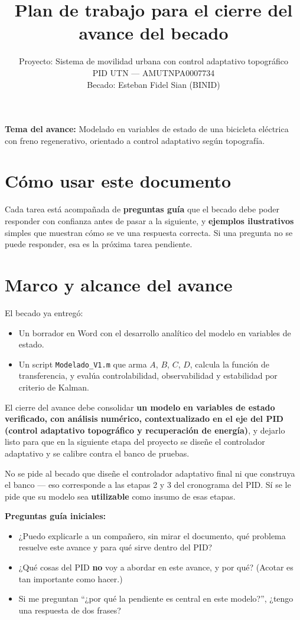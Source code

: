 \documentclass[11pt,a4paper]{article}
\title{Plan de trabajo para el cierre del avance del becado}
\author{Proyecto: Sistema de movilidad urbana con control adaptativo topográfico\\
        PID UTN --- AMUTNPA0007734\\[4pt]
        Becado: Esteban Fidel Sian (BINID)}
\date{}
\begin{document}
\maketitle

\noindent\textbf{Tema del avance:} Modelado en variables de estado de una bicicleta eléctrica con freno regenerativo, orientado a control adaptativo según topografía.

\hrulefill

\section*{Cómo usar este documento}

Cada tarea está acompañada de \textbf{preguntas guía} que el becado debe poder responder con confianza antes de pasar a la siguiente, y \textbf{ejemplos ilustrativos} simples que muestran cómo se ve una respuesta correcta. Si una pregunta no se puede responder, esa es la próxima tarea pendiente.

\hrulefill

\setcounter{section}{-1}
\section{Marco y alcance del avance}

El becado ya entregó:

\begin{itemize}
    \item Un borrador en Word con el desarrollo analítico del modelo en variables de estado.
    \item Un script \texttt{Modelado\_V1.m} que arma $A$, $B$, $C$, $D$, calcula la función de transferencia, y evalúa controlabilidad, observabilidad y estabilidad por criterio de Kalman.
\end{itemize}

El cierre del avance debe consolidar \textbf{un modelo en variables de estado verificado, con análisis numérico, contextualizado en el eje del PID (control adaptativo topográfico y recuperación de energía)}, y dejarlo listo para que en la siguiente etapa del proyecto se diseñe el controlador adaptativo y se calibre contra el banco de pruebas.

No se pide al becado que diseñe el controlador adaptativo final ni que construya el banco --- eso corresponde a las etapas 2 y 3 del cronograma del PID. Sí se le pide que su modelo sea \textbf{utilizable} como insumo de esas etapas.

\begin{guia}
\textbf{Preguntas guía iniciales:}
\begin{itemize}
    \item ¿Puedo explicarle a un compañero, sin mirar el documento, qué problema resuelve este avance y para qué sirve dentro del PID?
    \item ¿Qué cosas del PID \textbf{no} voy a abordar en este avance, y por qué? (Acotar es tan importante como hacer.)
    \item Si me preguntan ``¿por qué la pendiente es central en este modelo?'', ¿tengo una respuesta de dos frases?
\end{itemize}
\end{guia}
\end{document}
